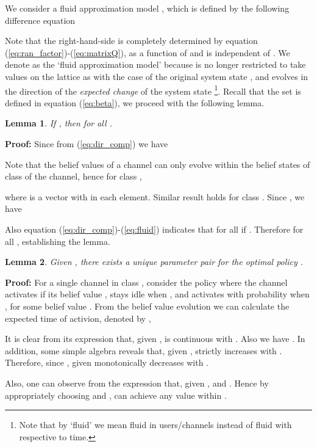 \documentclass[11pt,twocolumn]{IEEEtran}
\newtheorem{lemma}{Lemma}
\begin{document}
We consider a fluid approximation model , which is defined by the following difference equation


Note that the right-hand-side is completely determined by equation (\ref{eq:ran_factor})-(\ref{eq:matrixQ}), as a function of  and is independent of . We denote  as the `fluid approximation model' because  is no longer restricted to take values on the lattice as with the case of the original system state , and  evolves in the direction of the \emph{expected change} of the system state \footnote{Note that by `fluid' we mean fluid in users/channels instead of fluid with respective to time.}. Recall that the set  is defined in equation (\ref{eq:beta}), we proceed with the following lemma.

\begin{lemma}
\label{lemma:WitinZ}
If , then  for all .
\end{lemma}

\noindent \textbf{Proof:}
Since from (\ref{eq:dir_comp}) we have


Note that the belief values of a channel can only evolve within the belief states of class of the channel, hence for class ,

where  is a vector with  in each element. Similar result holds for class . Since , we have


Also equation (\ref{eq:dir_comp})-(\ref{eq:fluid}) indicates that  for all  if . Therefore  for all , establishing the lemma. 
\vspace{6pt}

\begin{lemma}
\label{lemma:alpha_achieve}
Given , there exists a unique parameter pair  for the optimal policy .
\end{lemma}

\noindent \textbf{Proof:}
For a single channel  in class , consider the policy where the channel activates if its belief value , stays idle when , and activates with probability  when , for some belief value . From the belief value evolution we can calculate the expected time of activion, denoted by ,


It is clear from its expression that, given ,  is continuous with . Also we have . In addition, some simple algebra reveals that, given ,  strictly increases with . Therefore, since , given   monotonically decreases with .

Also, one can observe from the expression that, given ,  and . Hence by appropriately choosing  and ,  can achieve any value within .
\vspace{3pt}
\end{document}
